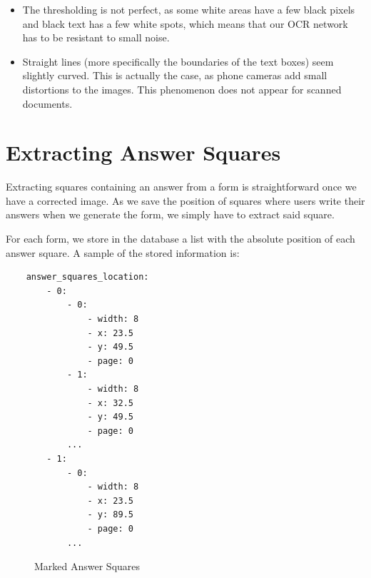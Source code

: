 \documentclass[11pt, a4paper]{report}
\begin{document}
\begin{itemize}
	\item The thresholding is not perfect, as some white areas have a few black pixels and black text has a few white spots, which means that our OCR network has to be resistant to small noise.
	\item Straight lines (more specifically the boundaries of the text boxes) seem slightly curved. This is actually the case, as phone cameras add small distortions to the images. This phenomenon does not appear for scanned documents.
\end{itemize}

\section{Extracting Answer Squares}

Extracting squares containing an answer from a form is straightforward once we have a corrected image. As we save the position of squares where users write their answers when we generate the form, we simply have to extract said square.

For each form, we store in the database a list with the absolute position of each answer square. A sample of the stored information is:

\begin{verbatim}
    answer_squares_location:
        - 0:
            - 0:
                - width: 8
                - x: 23.5
                - y: 49.5
                - page: 0
            - 1:
                - width: 8
                - x: 32.5
                - y: 49.5
                - page: 0
            ...
        - 1:
            - 0:
                - width: 8
                - x: 23.5
                - y: 89.5
                - page: 0
            ...
\end{verbatim}

\begin{figure}[!h]
	\centering
	\caption{Marked Answer Squares}
	\label{answer-squares-red}
\end{figure}
\end{document}
